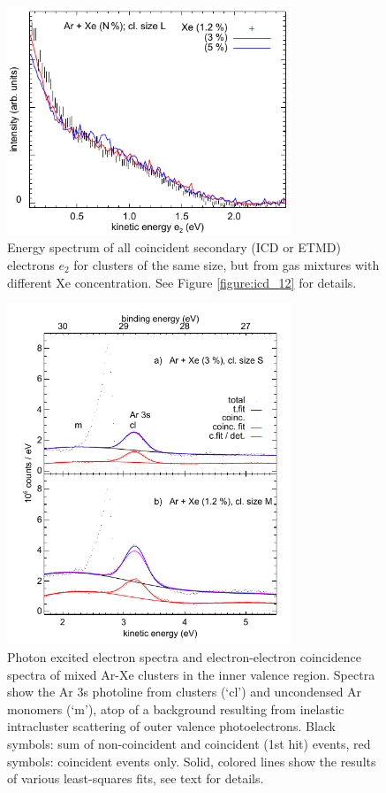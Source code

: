\begin{figure}[ht]
 \centering
 \includegraphics[width=8.5cm]{pics/figure_icd_l.pdf}
 \caption{
Energy spectrum of all coincident secondary (ICD or ETMD) electrons $e_2$ for clusters of the same size, but from gas mixtures with different Xe concentration. See Figure \protect\ref{figure:icd_12} for details.
}
 \label{figure:icd_l}
\end{figure}


\begin{figure}[ht]
 \centering
 \includegraphics[width=8.5cm]{pics/figure_ival.pdf}
 \caption{
Photon excited electron spectra and electron-electron coincidence spectra of mixed Ar-Xe clusters in the inner valence region. Spectra show the Ar 3s photoline from clusters (`cl') and uncondensed Ar monomers (`m'), atop of a background resulting from inelastic intracluster scattering of outer valence photoelectrons.\protect\cite{hergenhahn2002} Black symbols: sum of non-coincident and coincident (1st hit) events, red symbols: coincident events only. Solid, colored lines show the results of various least-squares fits, see text for details.
}
 \label{figure:ival}
\end{figure}



